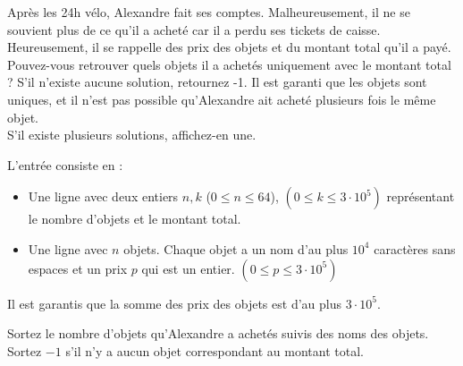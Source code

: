 \problemname{\problemyamlname}

\newcommand{\maxk}{3 \cdot 10^5}
\newcommand{\maxn}{64}

Après les 24h vélo, Alexandre fait ses comptes. Malheureusement, il ne se souvient plus de ce qu'il a acheté car il a perdu ses tickets de caisse. Heureusement, il se rappelle des prix des objets et du montant total qu'il a payé. Pouvez-vous retrouver quels objets il a achetés uniquement avec le montant total ? S'il n'existe aucune solution, retournez -1. Il est garanti que les objets sont uniques, et il n'est pas possible qu'Alexandre ait acheté plusieurs fois le même objet. \\
S'il existe plusieurs solutions, affichez-en une.

\begin{Input}
    L'entrée consiste en :
    \begin{itemize}
        \item Une ligne avec deux entiers $n, k$ ($0 \leq n \leq \maxn$), $(0 \leq k \leq \maxk)$ représentant le nombre d'objets et le montant total.
        \item Une ligne avec $n$ objets. Chaque objet a un nom d'au plus $10^4$ caractères sans espaces et un prix $p$ qui est un entier. $(0 \leq p \leq \maxk)$
    \end{itemize}
    Il est garantis que la somme des prix des objets est d'au plus $\maxk$.
\end{Input}

\begin{Output}
    Sortez le nombre d'objets qu'Alexandre a achetés suivis des noms des objets. Sortez $-1$ s'il n'y a aucun objet correspondant au montant total.
\end{Output}
